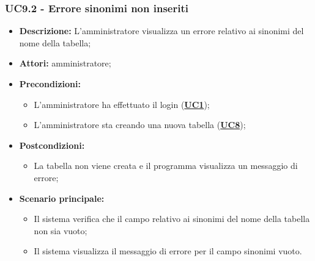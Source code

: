 \subsubsection{UC9.2 - Errore sinonimi non inseriti}
\label{sec:UC9.2}
\begin{itemize}
	\item \textbf{Descrizione:} L’amministratore visualizza un errore relativo ai sinonimi del nome della tabella;
	\item \textbf{Attori:} amministratore;
	\item \textbf{Precondizioni:} 
	\begin{itemize}
		\item L’amministratore ha effettuato il login (\hyperref[sec:UC1]{\textbf{UC1}});
		\item L’amministratore sta creando una nuova tabella (\hyperref[sec:UC1]{\textbf{UC8}});
	\end{itemize}
	\item \textbf{Postcondizioni:} 
	\begin{itemize}
		\item La tabella non viene creata e il programma visualizza un messaggio di errore;
	\end{itemize}
	\item \textbf{Scenario principale:} 
	\begin{itemize}
		\item Il sistema verifica che il campo relativo ai sinonimi del nome della tabella non sia vuoto;
		\item Il sistema visualizza il messaggio di errore per il campo sinonimi vuoto.
	\end{itemize}
\end{itemize}

